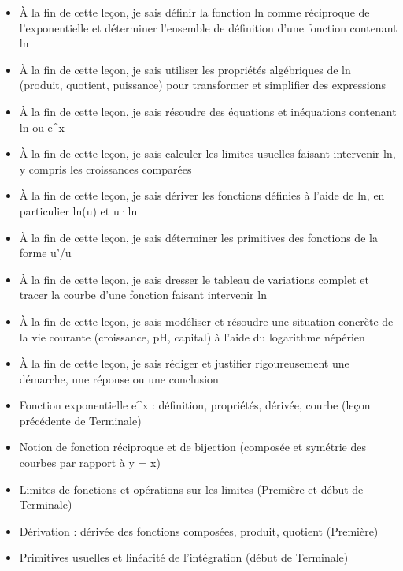 \documentclass[11pt]{article}
\begin{document}
\begin{objectifs}
\begin{itemize}
\item À la fin de cette leçon, je sais définir la fonction ln comme réciproque de l'exponentielle et déterminer l'ensemble de définition d'une fonction contenant ln
\item À la fin de cette leçon, je sais utiliser les propriétés algébriques de ln (produit, quotient, puissance) pour transformer et simplifier des expressions
\item À la fin de cette leçon, je sais résoudre des équations et inéquations contenant ln ou e\^{}x
\item À la fin de cette leçon, je sais calculer les limites usuelles faisant intervenir ln, y compris les croissances comparées
\item À la fin de cette leçon, je sais dériver les fonctions définies à l'aide de ln, en particulier ln(u) et u·ln
\item À la fin de cette leçon, je sais déterminer les primitives des fonctions de la forme u'/u
\item À la fin de cette leçon, je sais dresser le tableau de variations complet et tracer la courbe d'une fonction faisant intervenir ln
\item À la fin de cette leçon, je sais modéliser et résoudre une situation concrète de la vie courante (croissance, pH, capital) à l'aide du logarithme népérien
\item À la fin de cette leçon, je sais rédiger et justifier rigoureusement une démarche, une réponse ou une conclusion
\end{itemize}
\end{objectifs}

\begin{prerequis}
\begin{itemize}
\item Fonction exponentielle e\^{}x : définition, propriétés, dérivée, courbe (leçon précédente de Terminale)
\item Notion de fonction réciproque et de bijection (composée et symétrie des courbes par rapport à y = x)
\item Limites de fonctions et opérations sur les limites (Première et début de Terminale)
\item Dérivation : dérivée des fonctions composées, produit, quotient (Première)
\item Primitives usuelles et linéarité de l'intégration (début de Terminale)
\end{itemize}
\end{prerequis}
\end{document}
